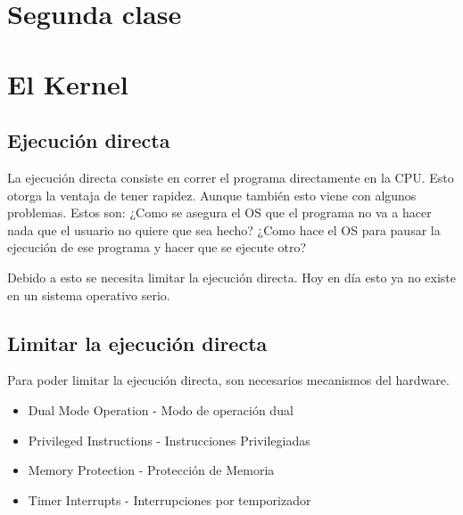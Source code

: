 \documentclass[titlepage,a4paper]{article}
\begin{document}


\section*{Segunda clase}


\section{El Kernel} %

\subsection*{Ejecución directa}
La ejecución directa consiste en correr el programa directamente en la CPU. Esto otorga la ventaja de tener rapidez. Aunque también esto viene con algunos problemas. Estos son: ¿Como se asegura el OS que el programa no va a hacer nada que el usuario no quiere que sea hecho? ¿Como hace el OS para pausar la ejecución de ese programa y hacer que se ejecute otro?

Debido a esto se necesita limitar la ejecución directa. Hoy en día esto ya no existe en un sistema operativo serio.

\subsection*{Limitar la ejecución directa}

Para poder limitar la ejecución directa, son necesarios mecanismos del hardware.

\begin{itemize}
    \item Dual Mode Operation - Modo de operación dual
    \item Privileged Instructions - Instrucciones Privilegiadas
    \item Memory Protection - Protección de Memoria
    \item Timer Interrupts - Interrupciones por temporizador
\end{itemize}
\end{document}
